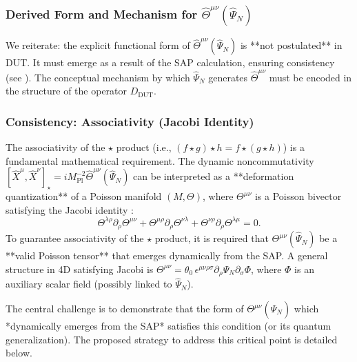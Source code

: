 \documentclass[11pt, a4paper]{article}
\theoremstyle{remark}
\newcommand{\Op}[1]{\hat{#1}}
\newcommand{\Star}{\star}
\newcommand{\Mpl}{M_{\mathrm{Pl}}}
\begin{document}
\subsubsection{Derived Form and Mechanism for \texorpdfstring{$\Op{\Theta}^{\mu\nu}(\Op{\Psi}_N)$}{Theta(PsiN)}}
\label{ssubsec:dynamic_theta_derived_final}
We reiterate: the explicit functional form of \( \Op{\Theta}^{\mu\nu}(\Op{\Psi}_N) \) is **not postulated** in DUT. It must emerge as a result of the SAP calculation, ensuring consistency (see ). The conceptual mechanism by which \( \Op{\Psi}_N \) generates \( \Op{\Theta}^{\mu\nu} \) must be encoded in the structure of the operator \( D_{\text{DUT}} \).

\subsubsection{Consistency: Associativity (Jacobi Identity)}
\label{ssubsec:associativity_final}

The associativity of the \( \Star \) product (i.e., \( (f \star g) \star h = f \star (g \star h) \)) is a fundamental mathematical requirement. The dynamic noncommutativity \( [\hat{X}^\mu, \hat{X}^\nu]_\star = i\Mpl^{-2} \Op{\Theta}^{\mu\nu}(\Op{\Psi}_N) \) can be interpreted as a **deformation quantization** of a Poisson manifold \( (M, \Theta) \), where \( \Theta^{\mu\nu} \) is a Poisson bivector satisfying the Jacobi identity \citep{Kontsevich2003Deformation, Vaisman1994Poisson}:
\begin{equation} \label{eq:poisson_condition_final}
\Theta^{\lambda\rho} \partial_\rho \Theta^{\mu\nu} + \Theta^{\mu\rho} \partial_\rho \Theta^{\nu\lambda} + \Theta^{\nu\rho} \partial_\rho \Theta^{\lambda\mu} = 0.
\end{equation}
To guarantee associativity of the \(\star\) product, it is required that \( \Theta^{\mu\nu}(\Op{\Psi}_N) \) be a **valid Poisson tensor** that emerges dynamically from the SAP. A general structure in 4D satisfying Jacobi is \( \Theta^{\mu\nu} = \theta_0 \, \epsilon^{\mu\nu\rho\sigma} \partial_\rho \Psi_N \partial_\sigma \Phi \), where \( \Phi \) is an auxiliary scalar field (possibly linked to \( \Op{\Psi}_N \)).

The central challenge is to demonstrate that the form of \( \Theta^{\mu\nu}(\Op{\Psi}_N) \) which *dynamically emerges from the SAP* satisfies this condition (or its quantum generalization). The proposed strategy to address this critical point is detailed below.
\end{document}
